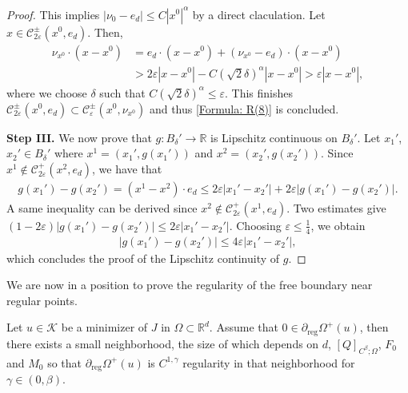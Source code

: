 \documentclass[11pt,reqno]{amsart}
\begin{document}
\begin{proof}
	This implies $|\nu_{0}-e_{d}|\leqslant C|x^{0}|^{\alpha}$ by a direct claculation. Let $x\in\mathcal{C}_{2\varepsilon}^{\pm}(x^{0},e_{d})$. Then,
	\begin{align*}
		\nu_{x^{0}}\cdot(x-x^{0})&=e_{d}\cdot(x-x^{0})+(\nu_{x^{0}}-e_{d})\cdot(x-x^{0})\\
		&>2\varepsilon|x-x^{0}|-C(\sqrt{2}\delta)^{\alpha}|x-x^{0}|>\varepsilon|x-x^{0}|,
	\end{align*}
	where we choose $\delta$ such that $C(\sqrt{2}\delta)^{\alpha}\leqslant\varepsilon$. This finishes $\mathcal{C}_{2\varepsilon}^{\pm}(x^{0},e_{d})\subset\mathcal{C}_{\varepsilon}^{\pm}(x^{0},\nu_{x^{0}})$ and thus \eqref{Formula: R(8)} is concluded.
	
	\textbf{Step III.} We now prove that $g\colon B_{\delta}'\to\mathbb{R}$ is Lipschitz continuous on $B_{\delta}'$. Let $x_{1}'$, $x_{2}'\in B_{\delta}'$ where $x^{1}=(x_{1}',g(x_{1}'))$ and $x^{2}=(x_{2}',g(x_{2}'))$. Since $x^{1}\notin\mathcal{C}_{2\varepsilon}^{+}(x^{2},e_{d})$, we have that
	\begin{align*}
		g(x_{1}')-g(x_{2}')=(x^{1}-x^{2})\cdot e_{d}\leqslant2\varepsilon|x_{1}'-x_{2}'|+2\varepsilon|g(x_{1}')-g(x_{2}')|.
	\end{align*}
	A same inequality can be derived since $x^{2}\notin\mathcal{C}_{2\varepsilon}^{+}(x^{1},e_{d})$. Two estimates give $(1-2\varepsilon)|g(x_{1}')-g(x_{2}')|\leqslant2\varepsilon|x_{1}'-x_{2}'|$. Choosing $\varepsilon\leqslant\frac{1}{4}$, we obtain
	\begin{align*}
		|g(x_{1}')-g(x_{2}')|\leqslant4\varepsilon|x_{1}'-x_{2}'|,
	\end{align*}
	which concludes the proof of the Lipschitz continuity of $g$.
\end{proof}
We are now in a position to prove the regularity of the free boundary near regular points.
\begin{proposition}\label{Proposition: Regularity of regular points}
	Let $u\in\mathcal{K}$ be a minimizer of $J$ in $\Omega\subset\mathbb{R}^{d}$. Assume that $0\in\partial_{\mathrm{reg}}\varOmega^{+}(u)$, then there exists a small neighborhood, the size of which depends on $d$, $[Q]_{C^{\beta};\Omega}$, $F_{0}$ and $M_{0}$ so that $\partial_{\mathrm{reg}}\varOmega^{+}(u)$ is $C^{1,\gamma}$ regularity in that neighborhood for $\gamma\in(0,\beta)$.
\end{proposition}
\end{document}
